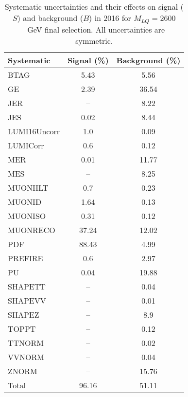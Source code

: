 \begin{table}[htbp]
\begin{center}
\caption{Systematic uncertainties and their effects on signal ($S$) and background ($B$) in 2016 for $M_{LQ}=2600$~GeV final selection. All uncertainties are symmetric.}
\begin{tabular}{lcc}
\hline\hline
Systematic & Signal (\%) & Background (\%) \\ \hline 
BTAG & 5.43 & 5.56\\ 
GE & 2.39 & 36.54\\ 
JER & -- & 8.22\\ 
JES & 0.02 & 8.44\\ 
LUMI16Uncorr & 1.0 & 0.09\\ 
LUMICorr & 0.6 & 0.12\\ 
MER & 0.01 & 11.77\\ 
MES & -- & 8.25\\ 
MUONHLT & 0.7 & 0.23\\ 
MUONID & 1.64 & 0.13\\ 
MUONISO & 0.31 & 0.12\\ 
MUONRECO & 37.24 & 12.02\\ 
PDF & 88.43 & 4.99\\ 
PREFIRE & 0.6 & 2.97\\ 
PU & 0.04 & 19.88\\ 
SHAPETT & -- & 0.04\\ 
SHAPEVV & -- & 0.01\\ 
SHAPEZ & -- & 8.9\\ 
TOPPT & -- & 0.12\\ 
TTNORM & -- & 0.02\\ 
VVNORM & -- & 0.04\\ 
ZNORM & -- & 15.76\\ 
Total & 96.16 & 51.11\\ \hline \hline
\end{tabular}
\label{tab:SysUncertainties_uujj_2600}
\end{center}
\end{table}

